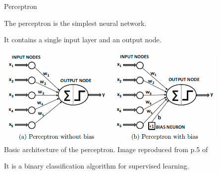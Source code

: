 %
%
%

\begin{frame}[t]{Perceptron}

    The \Gls{perceptron} 
    is the simplest neural network.

    It contains a single input layer and an output node.

    \begin{center}
        \includegraphics[width=0.85\textwidth]{./images/perceptron/basic_architecture.png}\\
        {\scriptsize \color{col:attribution} 
        Basic architecture of the perceptron. 
        Image reproduced from p.5 of \cite{Aggarwal:2018SpringerDL}}\\
    \end{center}

    It is a 
    binary classification 
    algorithm for 
    supervised learning.

\end{frame}

%
%
%


